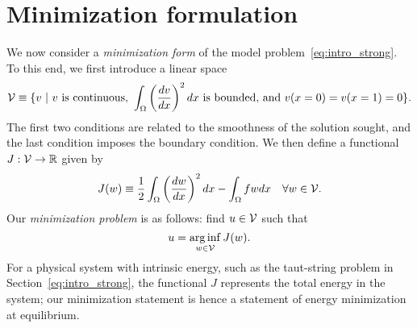 \section{Minimization formulation}
We now consider a \emph{minimization form} of the model problem~\eqref{eq:intro_strong}.  To this end, we first introduce a linear space
\begin{equation}
  \calV \equiv \{ v \ | \
   v \text{ is continuous, } 
   \int_\Omega \left(\dd{v}{x}\right)^2 dx \text{ is bounded, and } %
   v(x=0) = v(x=1) = 0 \}.
  \label{eq:intro_V}
\end{equation}
The first two conditions are related to the smoothness of the solution sought, and the last condition imposes the boundary condition.
We then define a functional $J: \mathcal{V} \to \mathbb{R}$ given by
\begin{equation}
  J(w) \equiv \frac{1}{2} \int_\Omega \left( \frac{d w}{d x} \right)^2 dx - \int_\Omega f w dx \quad \forall w \in \mathcal{V}.
  \label{eq:intro_J}
\end{equation}
Our \emph{minimization problem} is as follows: find $u \in \mathcal{V}$ such that
\begin{equation}
  u = \operatorname*{arg\,inf}_{w \in \mathcal{V}} J(w).
  \label{eq:intro_min}
\end{equation}
For a physical system with intrinsic energy, such as the taut-string problem in Section~\ref{eq:intro_strong}, the functional $J$ represents the total energy in the system; our minimization statement is hence a statement of energy minimization at equilibrium. 

